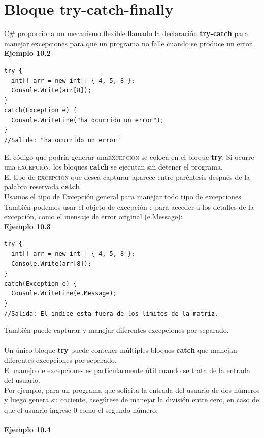 \documentclass[12pt,a4paper]{report}
\begin{document}
\section{Bloque try-catch-finally}
C\# proporciona un mecanismo flexible llamado la declaración\textbf{ try-catch} para manejar excepciones para que un programa no falle cuando se produce un error.\\\textbf{Ejemplo 10.2}
\begin{lstlisting}
try {
  int[] arr = new int[] { 4, 5, 8 };
  Console.Write(arr[8]);
}
catch(Exception e) {
  Console.WriteLine("ha ocurrido un error");
}
//Salida: "ha ocurrido un error"
\end{lstlisting}El código que podría generar una\textsc{excepción} se coloca en el bloque\textbf{ try}. Si ocurre una\textsc{ excepción}, los bloques\textbf{ catch} se ejecutan sin detener el programa.\\El tipo de\textsc{ excepción} que desea capturar aparece entre paréntesis después de la palabra reservada\textbf{ catch}.\\Usamos el tipo de Excepción general para manejar todo tipo de excepciones. También podemos usar el objeto de excepción e para acceder a los detalles de la excepción, como el mensaje de error original (e.Message):\\\textbf{Ejemplo 10.3}
\begin{lstlisting}
try {
  int[] arr = new int[] { 4, 5, 8 };
  Console.Write(arr[8]);
}
catch(Exception e) {
  Console.WriteLine(e.Message);
}
//Salida: El indice esta fuera de los limites de la matriz.
\end{lstlisting}También puede capturar y manejar diferentes excepciones por separado.\\\\Un único bloque\textbf{ try} puede contener múltiples bloques\textbf{ catch} que manejan diferentes excepciones por separado.\\El manejo de excepciones es particularmente útil cuando se trata de la entrada del usuario.\\Por ejemplo, para un programa que solicita la entrada del usuario de dos números y luego genera su cociente, asegúrese de manejar la división entre cero, en caso de que el usuario ingrese 0 como el segundo número.\\\\\textbf{Ejemplo 10.4}
\end{document}
